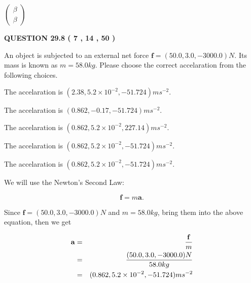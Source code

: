 \documentclass[12pt]{article}
\begin{document}
   
 $  \left( \begin{array}
 {
 c
 }
 \beta \\ 
 \beta
 \end{array} \right) $ 
  
\vspace{0.2in}
  
{\textbf{\Large{QUESTION
29.8 
 (           7 ,          14 ,          50 )
}}}
  
  
 
An object is subjected to an external net force $\mathbf{f}=
(50.0 , 3.0 , -3000.0) N$.
Its mass is known as $m= %
58.0 kg$.
Please choose the correct accelaration from the following choices.
 
 
  The accelaration is $  %
(
2.38,
5.2 \times 10^{-2},
-51.724)
ms^{-2} $.
 
 
  The accelaration is $  %
(
0.862,
-0.17,
-51.724)
ms^{-2} $.
 
 
  The accelaration is $  %
(
0.862,
5.2 \times 10^{-2},
227.14)
ms^{-2} $.
 
 
  The accelaration is $  %
(
0.862,
5.2 \times 10^{-2},
-51.724)
ms^{-2} $.
 
 
\noindent{}
 
 
  The accelaration is $  %
(
0.862,
5.2 \times 10^{-2},
-51.724)
ms^{-2} $.
 
 
\noindent{}
 
 
 
 
 
\noindent{}
 
 

We will use the Newton's Second Law:
 
\[
\mathbf{f}=m\mathbf{a}.
\]
 
Since $\mathbf{f}= %
(50.0 , 3.0 , -3000.0) N$
and $m= %
58.0kg$, bring them into the above equation, then we get
 
\begin{eqnarray*}
\mathbf{a}&=&\frac{\mathbf{f}}m  \\
&=&\frac{ %
(50.0 , 3.0 , -3000.0) N}{ %
58.0kg}  \\
&=& %
(0.862 , 5.2 \times 10^{-2} , -51.724) ms^{-2}
\end{eqnarray*}
 
\end{document}
